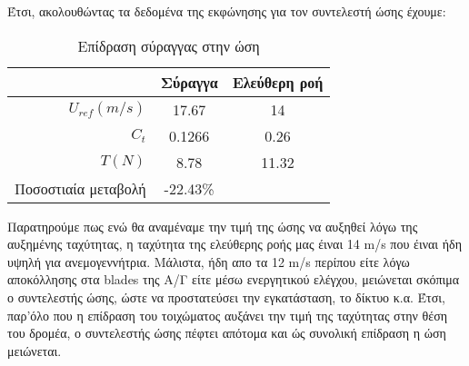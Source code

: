 Έτσι, ακολουθώντας τα δεδομένα της εκφώνησης για τον συντελεστή ώσης έχουμε:

\begin{table}[h!]
    \begin{center}
        \begin{tabular}[c]{|r|c|c|}
            \hline
            & Σύραγγα & Ελεύθερη ροή\\
            \hline
            $U_{ref} (m/s)$ & 17.67 & 14 \\
            $C_t$ & 0.1266 & 0.26 \\
            $T (N)$ & 8.78 & 11.32 \\
            \hline
            Ποσοστιαία μεταβολή  & -22.43\% &  \\
            \hline
        \end{tabular}
    \end{center}
    \caption{Επίδραση σύραγγας στην ώση}
    \label{tab:thrust}
\end{table}

Παρατηρούμε πως ενώ θα αναμέναμε την τιμή της ώσης να αυξηθεί λόγω της αυξημένης ταχύτητας, η ταχύτητα της ελεύθερης ροής μας έιναι 14 m/s που έιναι ήδη υψηλή για ανεμογεννήτρια. Μάλιστα, ήδη απο τα 12 m/s περίπου είτε λόγω αποκόλλησης στα blades της Α/Γ είτε μέσω ενεργητικού ελέγχου, μειώνεται σκόπιμα ο συντελεστής ώσης, ώστε να προστατεύσει την εγκατάσταση, το δίκτυο κ.α. Έτσι, παρ'όλο που η επίδραση του τοιχώματος αυξάνει την τιμή της ταχύτητας στην θέση του δρομέα, ο συντελεστής ώσης πέφτει απότομα και ώς συνολική επίδραση η ώση μειώνεται. 
